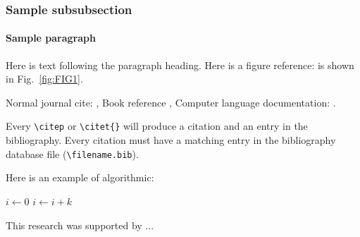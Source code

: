    \subsubsection{Sample subsubsection\label{subsubsec:1}}

\paragraph{Sample paragraph}Here is text following the paragraph
heading.
Here is a figure reference: is shown in Fig.~\ref{fig:FIG1}.



Normal journal cite: \citep{joursamp1},
 Book reference \citet{booksamp1},
Computer language documentation:
\citep{sampcode2}.

Every \verb+\citep+  or \verb+\citet{}+ will produce a citation and an entry in the
bibliography. Every citation must have a matching entry in the
bibliography
database file (\verb+\filename.bib+).


Here is an example of algorithmic:


\begin{algorithmic}
    \State $i\gets 0$
\Else
        \State $i\gets i+k$
    \EndIf
\EndIf
\end{algorithmic}


\begin{acknowledgments}
This research was supported by  ...
\end{acknowledgments}


